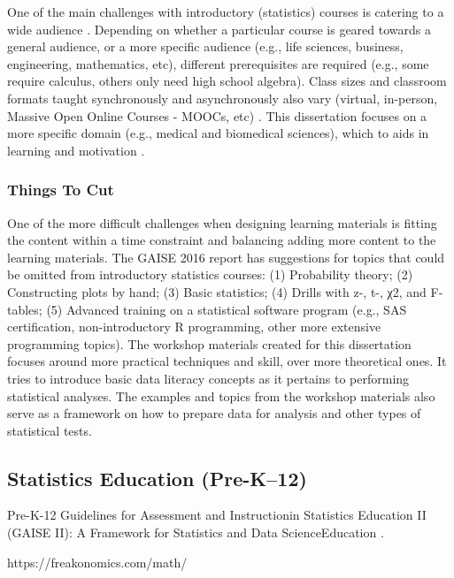 \documentclass[010-intro.tex]{subfiles}
\begin{document}
    One of the main challenges with introductory (statistics) courses is catering to a wide audience
    \cite{gaise2016}.
    Depending on whether a particular course is geared towards a general audience, or a more specific audience
    (e.g., life sciences, business, engineering, mathematics, etc),
    different prerequisites are required
    (e.g., some require calculus, others only need high school algebra).
    Class sizes and classroom formats taught synchronously and asynchronously also vary
    (virtual, in-person, Massive Open Online Courses - MOOCs, etc)
    \cite{gaise2016}.
    This dissertation focuses on a more specific domain (e.g., medical and biomedical sciences),
    which to aids in learning and motivation
    \cite{ambrose2010learning, wilson2019teaching, krossDemocratizationDataScience2020}.
    
    \subsubsection{Things To Cut}
    
        One of the more difficult challenges when designing learning materials is fitting the content within a time constraint
        and balancing adding more content to the learning materials. %
        The GAISE 2016 report has suggestions for topics that could be omitted from introductory statistics courses:
        (1) Probability theory;
        (2) Constructing plots by hand;
        (3) Basic statistics;
        (4) Drills with z-, t-, χ2, and F-tables;
        (5) Advanced training on a statistical software program
            (e.g., SAS certification, non-introductory R programming, other more extensive programming topics).
        The workshop materials created for this dissertation
        focuses around more practical techniques and skill, over more theoretical ones.
        It tries to introduce basic data literacy concepts as it pertains to performing statistical analyses.
        The examples and topics from the workshop materials
        also serve as a framework on how to prepare data for analysis and other types of statistical tests.
    
\subsection{Statistics Education (Pre-K–12)}

Pre-K-12 Guidelines for Assessment and Instructionin Statistics Education II (GAISE II): A Framework for Statistics and Data ScienceEducation
\cite{gaise2k12}.

https://freakonomics.com/math/
\end{document}

